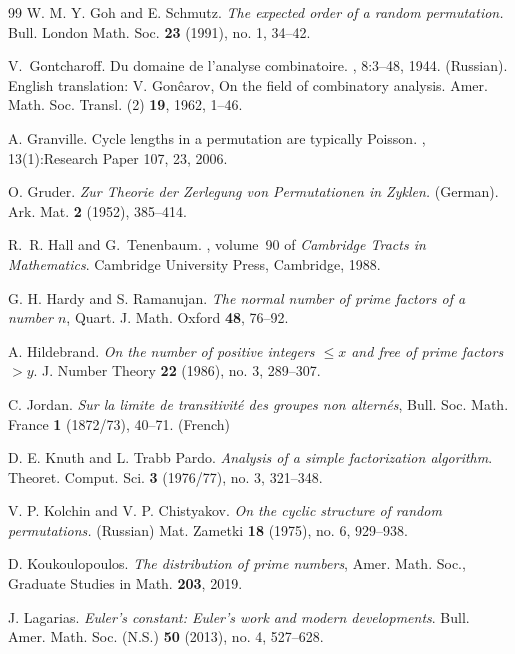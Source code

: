 \begin{thebibliography}{99}
{\sc W. M. Y. Goh and E. Schmutz}.
\emph{The expected order of a random permutation.}
Bull. London Math. Soc. {\bf 23} (1991), no. 1, 34--42. 


{\sc V.~Gontcharoff}.
\newblock Du domaine de l'analyse combinatoire.
,
  8:3--48, 1944. (Russian).
  English translation: V. Gon{\^ c}arov,
  On the field of combinatory analysis.
Amer. Math. Soc. Transl. (2) {\bf 19}, 1962, 1--46. 

{\sc A. Granville}.
\newblock Cycle lengths in a permutation are typically {P}oisson.
, 13(1):Research Paper 107, 23, 2006.

{\sc O. Gruder}.
\emph{Zur Theorie der Zerlegung von Permutationen in Zyklen.} (German).
Ark. Mat. {\bf 2} (1952), 385--414. 

{\sc R.~R. Hall and G.~Tenenbaum}.
, volume~90 of {\em Cambridge Tracts in Mathematics}.
\newblock Cambridge University Press, Cambridge, 1988.

 {\sc G. H. Hardy and S. Ramanujan}.
\emph{The normal number of prime factors of a number $n$},
Quart. J. Math. Oxford {\bf 48}, 76--92.

{\sc A. Hildebrand}.
\emph{On the number of positive integers $\le x$ and free of prime factors $>y$}.
J. Number Theory {\bf 22} (1986), no. 3, 289--307.

{\sc C. Jordan}.
\emph{Sur la limite de transitivit{\' e} des groupes non altern{\' e}s}, Bull. Soc. Math. France {\bf 1} (1872/73), 40--71. (French)


{\sc D. E. Knuth and L. Trabb Pardo}.
\emph{Analysis of a simple factorization algorithm}.
Theoret. Comput. Sci. {\bf 3} (1976/77), no. 3, 321--348. 


{\sc V. P. Kolchin and V. P. Chistyakov}.
\emph{On the cyclic structure of random permutations.} (Russian)
Mat. Zametki {\bf 18} (1975), no. 6, 929--938. 


{\sc D. Koukoulopoulos}. \emph{The distribution of prime numbers},
Amer. Math. Soc., Graduate Studies in Math. {\bf 203}, 2019.

{\sc J. Lagarias}.
\emph{Euler's constant: Euler's work and modern developments}.
Bull. Amer. Math. Soc. (N.S.) {\bf 50} (2013), no. 4, 527--628. 


\end{thebibliography}
